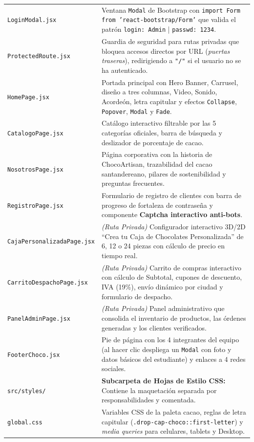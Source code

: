 \documentclass[12pt,letterpaper]{article}
\begin{document}
\begin{longtable}{p{} p{}}
\quad \texttt{LoginModal.jsx} & Ventana \texttt{Modal} de Bootstrap con \texttt{import Form from 'react-bootstrap/Form'} que valida el patrón \texttt{login: Admin} | \texttt{passwd: 1234}. \\
\quad \texttt{ProtectedRoute.jsx} & Guardia de seguridad para rutas privadas que bloquea accesos directos por URL (\textit{puertas traseras}), redirigiendo a \texttt{"/"} si el usuario no se ha autenticado. \\
\quad \texttt{HomePage.jsx} & Portada principal con Hero Banner, Carrusel, diseño a tres columnas, Video, Sonido, Acordeón, letra capitular y efectos \texttt{Collapse}, \texttt{Popover}, \texttt{Modal} y \texttt{Fade}. \\
\quad \texttt{CatalogoPage.jsx} & Catálogo interactivo filtrable por las 5 categorías oficiales, barra de búsqueda y deslizador de porcentaje de cacao. \\
\quad \texttt{NosotrosPage.jsx} & Página corporativa con la historia de ChocoArtisan, trazabilidad del cacao santandereano, pilares de sostenibilidad y preguntas frecuentes. \\
\quad \texttt{RegistroPage.jsx} & Formulario de registro de clientes con barra de progreso de fortaleza de contraseña y componente \textbf{Captcha interactivo anti-bots}. \\
\quad \texttt{CajaPersonalizadaPage.jsx} & \textit{(Ruta Privada)} Configurador interactivo 3D/2D ``Crea tu Caja de Chocolates Personalizada'' de 6, 12 o 24 piezas con cálculo de precio en tiempo real. \\
\quad \texttt{CarritoDespachoPage.jsx} & \textit{(Ruta Privada)} Carrito de compras interactivo con cálculo de Subtotal, cupones de descuento, IVA (19\%), envío dinámico por ciudad y formulario de despacho. \\
\quad \texttt{PanelAdminPage.jsx} & \textit{(Ruta Privada)} Panel administrativo que consolida el inventario de productos, las órdenes generadas y los clientes verificados. \\
\quad \texttt{FooterChoco.jsx} & Pie de página con los 4 integrantes del equipo (al hacer clic despliega un \texttt{Modal} con foto y datos básicos del estudiante) y enlaces a 4 redes sociales. \\
\midrule
\texttt{src/styles/} & \textbf{Subcarpeta de Hojas de Estilo CSS:} Contiene la maquetación separada por responsabilidades y comentada. \\
\quad \texttt{global.css} & Variables CSS de la paleta cacao, reglas de letra capitular (\texttt{.drop-cap-choco::first-letter}) y \textit{media queries} para celulares, tablets y Desktop. \\

\end{longtable}
\end{document}
